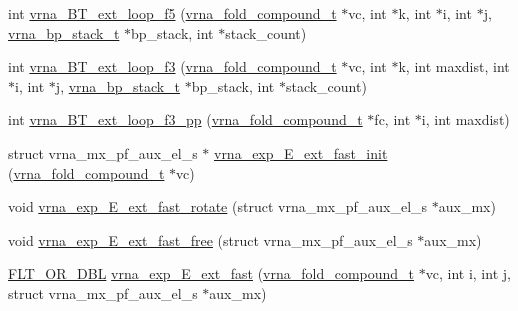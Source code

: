 \begin{DoxyCompactItemize}
int \mbox{\hyperlink{group__loops_ga55074e49f49ac4cd71395b1bb7a35f5b}{vrna\+\_\+\+B\+T\+\_\+ext\+\_\+loop\+\_\+f5}} (\mbox{\hyperlink{group__fold__compound_ga1b0cef17fd40466cef5968eaeeff6166}{vrna\+\_\+fold\+\_\+compound\+\_\+t}} $\ast$vc, int $\ast$k, int $\ast$i, int $\ast$j, \mbox{\hyperlink{group__data__structures_gaa651bda42e7692f08cb603cd6834b0ee}{vrna\+\_\+bp\+\_\+stack\+\_\+t}} $\ast$bp\+\_\+stack, int $\ast$stack\+\_\+count)
\item 
int \mbox{\hyperlink{group__loops_gaf80500114aa4eed8f9dba1e98a1056a7}{vrna\+\_\+\+B\+T\+\_\+ext\+\_\+loop\+\_\+f3}} (\mbox{\hyperlink{group__fold__compound_ga1b0cef17fd40466cef5968eaeeff6166}{vrna\+\_\+fold\+\_\+compound\+\_\+t}} $\ast$vc, int $\ast$k, int maxdist, int $\ast$i, int $\ast$j, \mbox{\hyperlink{group__data__structures_gaa651bda42e7692f08cb603cd6834b0ee}{vrna\+\_\+bp\+\_\+stack\+\_\+t}} $\ast$bp\+\_\+stack, int $\ast$stack\+\_\+count)
\item 
int \mbox{\hyperlink{group__loops_gaf5360c7f7f85f5d557592a3336bef945}{vrna\+\_\+\+B\+T\+\_\+ext\+\_\+loop\+\_\+f3\+\_\+pp}} (\mbox{\hyperlink{group__fold__compound_ga1b0cef17fd40466cef5968eaeeff6166}{vrna\+\_\+fold\+\_\+compound\+\_\+t}} $\ast$fc, int $\ast$i, int maxdist)
\item 
struct vrna\+\_\+mx\+\_\+pf\+\_\+aux\+\_\+el\+\_\+s $\ast$ \mbox{\hyperlink{group__loops_ga3da479a5c627d50530d81f028c181731}{vrna\+\_\+exp\+\_\+\+E\+\_\+ext\+\_\+fast\+\_\+init}} (\mbox{\hyperlink{group__fold__compound_ga1b0cef17fd40466cef5968eaeeff6166}{vrna\+\_\+fold\+\_\+compound\+\_\+t}} $\ast$vc)
\item 
void \mbox{\hyperlink{group__loops_gabe4ed7e3d6152a3b9db4e4ed762aa1ba}{vrna\+\_\+exp\+\_\+\+E\+\_\+ext\+\_\+fast\+\_\+rotate}} (struct vrna\+\_\+mx\+\_\+pf\+\_\+aux\+\_\+el\+\_\+s $\ast$aux\+\_\+mx)
\item 
void \mbox{\hyperlink{group__loops_ga4357b7937f1b840f063e44b859332f98}{vrna\+\_\+exp\+\_\+\+E\+\_\+ext\+\_\+fast\+\_\+free}} (struct vrna\+\_\+mx\+\_\+pf\+\_\+aux\+\_\+el\+\_\+s $\ast$aux\+\_\+mx)
\item 
\mbox{\hyperlink{group__data__structures_ga31125aeace516926bf7f251f759b6126}{F\+L\+T\+\_\+\+O\+R\+\_\+\+D\+BL}} \mbox{\hyperlink{group__loops_ga1c40acdc5e007f72d37a404127e9bcfb}{vrna\+\_\+exp\+\_\+\+E\+\_\+ext\+\_\+fast}} (\mbox{\hyperlink{group__fold__compound_ga1b0cef17fd40466cef5968eaeeff6166}{vrna\+\_\+fold\+\_\+compound\+\_\+t}} $\ast$vc, int i, int j, struct vrna\+\_\+mx\+\_\+pf\+\_\+aux\+\_\+el\+\_\+s $\ast$aux\+\_\+mx)
\item 

\end{DoxyCompactItemize}
